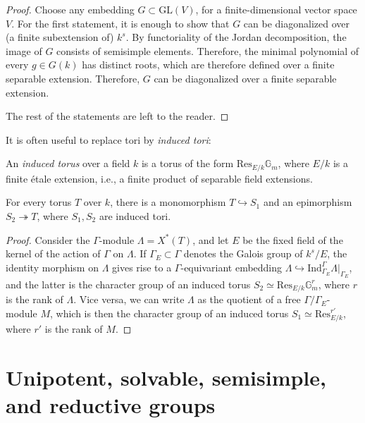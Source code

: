 \begin{proof}
 Choose any embedding $G\subset \text{GL}(V)$, for a finite-dimensional vector space $V$. For the first statement, it is enough to show that $G$ can be diagonalized over (a finite subextension of) $k^s$. By functoriality of the Jordan decomposition, the image of $G$ consists of semisimple elements. Therefore, the minimal polynomial of every $g\in G(k)$ has distinct roots, which are therefore defined over a finite separable extension. Therefore, $G$ can be diagonalized over a finite separable extension.
 
 The rest of the statements are left to the reader.
\end{proof}

It is often useful to replace tori by \emph{induced tori}:

\begin{definition}
 \label{definition-induced-torus}
An {\it induced torus} over a field $k$ is a torus of the form $\text{Res}_{E/k} \mathbb G_m$, where $E/k$ is a finite \'etale extension, i.e., a finite product of separable field extensions.
\end{definition}

\begin{lemma}
 \label{lemma-induced-tori}
For every torus $T$ over $k$, there is a monomorphism $T\hookrightarrow S_1$ and an epimorphism $S_2\twoheadrightarrow T$, where $S_1, S_2$ are induced tori.
\end{lemma}

\begin{proof}
 Consider the $\Gamma$-module $\Lambda=X^*(T)$, and let $E$ be the fixed field of the kernel of the action of $\Gamma$ on $\Lambda$. If $\Gamma_E \subset \Gamma$ denotes the Galois group of $k^s/E$, the identity morphism on $\Lambda$ gives rise to a $\Gamma$-equivariant embedding $\Lambda \hookrightarrow \text{Ind}_{\Gamma_E}^\Gamma \Lambda|_{\Gamma_E}$, and the latter is the character group of an induced torus $S_2 \simeq \text{Res}_{E/k} \mathbb G_m^r$, where $r$ is the rank of $\Lambda$. Vice versa, we can write $\Lambda$ as the quotient of a free $\Gamma/\Gamma_E$-module $M$, which is then the character group of an induced torus $S_1 \simeq \text{Res}_{E/k}^{r'}$, where $r'$ is the rank of $M$. 
\end{proof}



\section{Unipotent, solvable, semisimple, and reductive groups}
\label{section-groups}

